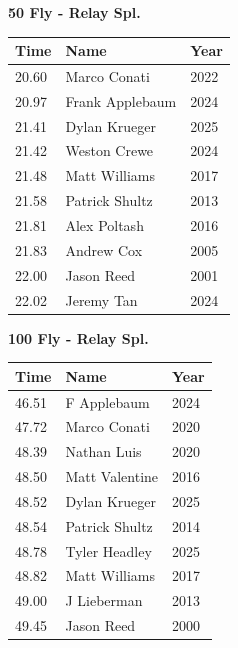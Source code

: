 \vspace{1.2em}
\noindent\begin{minipage}[t]{0.48\textwidth}
\centering
\textbf{\textcolor{teamprimary}{50 Fly - Relay Spl.}}\par
\vspace{0.5em}
\centering
\small
\renewcommand{\arraystretch}{1.0}
\setlength{\tabcolsep}{4pt}
\begin{tabular}{@{}p{1.8cm}p{3.0cm}p{1.0cm}@{}}
\toprule
\textbf{Time} & \textbf{Name} & \textbf{Year} \\
\midrule
20.60 & Marco Conati & 2022 \\
20.97 & Frank Applebaum & 2024 \\
21.41 & Dylan Krueger & 2025 \\
21.42 & Weston Crewe & 2024 \\
21.48 & Matt Williams & 2017 \\
21.58 & Patrick Shultz & 2013 \\
21.81 & Alex Poltash & 2016 \\
21.83 & Andrew Cox & 2005 \\
22.00 & Jason Reed & 2001 \\
22.02 & Jeremy Tan & 2024 \\
\bottomrule
\end{tabular}
\end{minipage}
\hfill
\begin{minipage}[t]{0.48\textwidth}
\centering
\textbf{\textcolor{teamprimary}{100 Fly - Relay Spl.}}\par
\vspace{0.5em}
\centering
\small
\renewcommand{\arraystretch}{1.0}
\setlength{\tabcolsep}{4pt}
\begin{tabular}{@{}p{1.8cm}p{3.0cm}p{1.0cm}@{}}
\toprule
\textbf{Time} & \textbf{Name} & \textbf{Year} \\
\midrule
46.51 & F Applebaum & 2024 \\
47.72 & Marco Conati & 2020 \\
48.39 & Nathan Luis & 2020 \\
48.50 & Matt Valentine & 2016 \\
48.52 & Dylan Krueger & 2025 \\
48.54 & Patrick Shultz & 2014 \\
48.78 & Tyler Headley & 2025 \\
48.82 & Matt Williams & 2017 \\
49.00 & J Lieberman & 2013 \\
49.45 & Jason Reed & 2000 \\
\bottomrule
\end{tabular}
\end{minipage}

